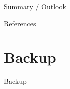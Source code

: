 \documentclass[t,10pt]{beamer}
\begin{document}
\begin{frame}{Summary / Outlook}
\end{frame}

%
%


\appendix

\begin{frame}[allowframebreaks]{References}
\nocite{*}
\scriptsize


\end{frame}

\section{Backup}

\begin{frame}{Backup}
\end{frame}
\end{document}
